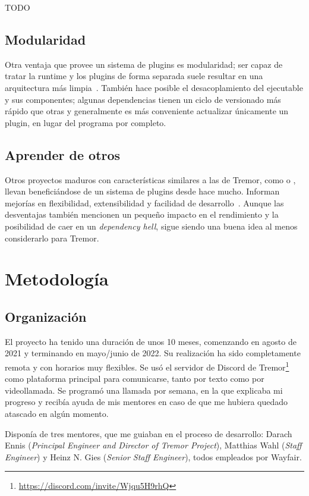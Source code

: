 TODO

\subsection{Modularidad}

Otra ventaja que provee un sistema de plugins es modularidad; ser capaz de
tratar la runtime y los plugins de forma separada suele resultar en una
arquitectura más limpia~\cite{baldwin2000design}. También hace posible el
desacoplamiento del ejecutable y sus componentes; algunas dependencias tienen un
ciclo de versionado más rápido que otras y generalmente es más conveniente
actualizar únicamente un plugin, en lugar del programa por completo.

\subsection{Aprender de otros}

Otros proyectos maduros con características similares a las de Tremor, como
\textcite{nginx} o \textcite{apachehttpserver}, llevan beneficiándose de un
sistema de plugins desde hace mucho. Informan mejorías en flexibilidad,
extensibilidad y facilidad de
desarrollo~\cite{nginxPluginsAdvantages}\cite{apachePluginsAdvantages}. Aunque
las desventajas también mencionen un pequeño impacto en el rendimiento y la
posibilidad de caer en un \emph{dependency hell}, sigue siendo una buena idea al
menos considerarlo para Tremor.

\section{Metodología}

\subsection{Organización}

El proyecto ha tenido una duración de unos 10 meses, comenzando en agosto de
2021 y terminando en mayo/junio de 2022. Su realización ha sido completamente
remota y con horarios muy flexibles. Se usó el servidor de Discord de
Tremor\footnote{\url{https://discord.com/invite/Wjqu5H9rhQ}} como plataforma
principal para comunicarse, tanto por texto como por videollamada. Se programó
una llamada por semana, en la que explicaba mi progreso y recibía ayuda de mis
mentores en caso de que me hubiera quedado atascado en algún momento.

Disponía de tres mentores, que me guiaban en el proceso de desarrollo: Darach
Ennis (\emph{Principal Engineer and Director of Tremor Project}), Matthias Wahl
(\emph{Staff Engineer}) y Heinz N. Gies (\emph{Senior Staff Engineer}), todos
empleados por Wayfair.

